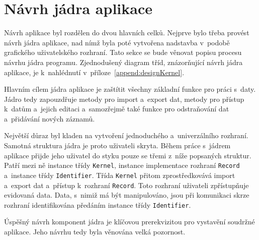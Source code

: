 	\section{Návrh jádra aplikace}
	Návrh aplikace byl rozdělen do dvou hlavních celků. Nejprve bylo třeba provést návrh jádra aplikace, nad nímž byla poté vytvořena nadstavba v~podobě grafického uživatelského rozhraní. Tato sekce se bude věnovat popisu procesu návrhu jádra programu. Zjednodušený diagram tříd, znázorňující návrh jádra aplikace, je k~nahlédnutí v~příloze~\ref{append:designKernel}. \par
	Hlavním cílem jádra aplikace je zaštítit všechny základní funkce pro práci s~daty. Jádro tedy zapouzdřuje metody pro import a~export dat, metody pro přístup k~datům a~jejich editaci a~samozřejmě také funkce pro odstraňování dat a~přidávání nových záznamů. \par
	Největší důraz byl kladen na vytvoření jednoduchého a~univerzálního rozhraní. Samotná struktura jádra je proto uživateli skryta. Během práce s~jádrem aplikace přijde jeho uživatel do styku pouze se třemi z~níže popsaných struktur. Patří mezi ně instance třídy \texttt{Kernel}, instance implementace rozhraní \texttt{Record} a~instance třídy \texttt{Identifier}. Třída \texttt{Kernel} přitom zprostředkovává import a~export dat a~přístup k~rozhraní \texttt{Record}. Toto rozhraní uživateli zpřístupňuje evidovaná data. Data, s~nimiž má být manipulováno, jsou při komunikaci skrze rozhraní identifikována předáním instance třídy \texttt{Identifier}. \par
	Úspěšný návrh komponent jádra je klíčovou prerekvizitou pro vystavění soudržné aplikace. Jeho návrhu tedy byla věnována velká pozornost. \par
		
	
	
